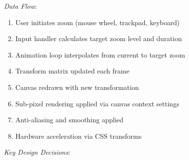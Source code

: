 \documentclass[11pt]{article}
\begin{document}
\emph{Data Flow}:

\begin{enumerate}
\item User initiates zoom (mouse wheel, trackpad, keyboard)
\item Input handler calculates target zoom level and duration
\item Animation loop interpolates from current to target zoom
\item Transform matrix updated each frame
\item Canvas redrawn with new transformation
\item Sub-pixel rendering applied via canvas context settings
\item Anti-aliasing and smoothing applied
\item Hardware acceleration via CSS transforms
\end{enumerate}

\emph{Key Design Decisions}:
\end{document}
